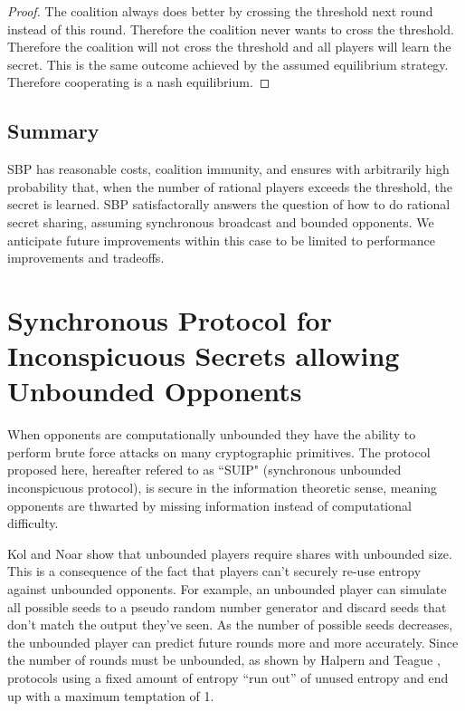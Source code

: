 \documentclass{dalcsthesis}
\begin{document}
\begin{proof}
The coalition always does better by crossing the threshold next round instead of this round. Therefore the coalition never wants to cross the threshold. Therefore the coalition will not cross the threshold and all players will learn the secret. This is the same outcome achieved by the assumed equilibrium strategy. Therefore cooperating is a nash equilibrium.
\end{proof}


\subsection{Summary}

SBP has reasonable costs, coalition immunity, and ensures with arbitrarily high probability that, when the number of rational players exceeds the threshold, the secret is learned. SBP satisfactorally answers the question of how to do rational secret sharing, assuming synchronous broadcast and bounded opponents. We anticipate future improvements within this case to be limited to performance improvements and tradeoffs.



\section{Synchronous Protocol for Inconspicuous Secrets allowing Unbounded Opponents}

When opponents are computationally unbounded they have the ability to perform brute force attacks on many cryptographic primitives. The protocol proposed here, hereafter refered to as ``SUIP" (synchronous unbounded inconspicuous protocol), is secure in the information theoretic sense, meaning opponents are thwarted by missing information instead of computational difficulty.

Kol and Noar \cite{kol08} show that unbounded players require shares with unbounded size. This is a consequence of the fact that players can't securely re-use entropy against unbounded opponents. For example, an unbounded player can simulate all possible seeds to a pseudo random number generator and discard seeds that don't match the output they've seen. As the number of possible seeds decreases, the unbounded player can predict future rounds more and more accurately. Since the number of rounds must be unbounded, as shown by Halpern and Teague \cite{halpern04}, protocols using a fixed amount of entropy ``run out'' of unused entropy and end up with a maximum temptation of 1.
\end{document}
